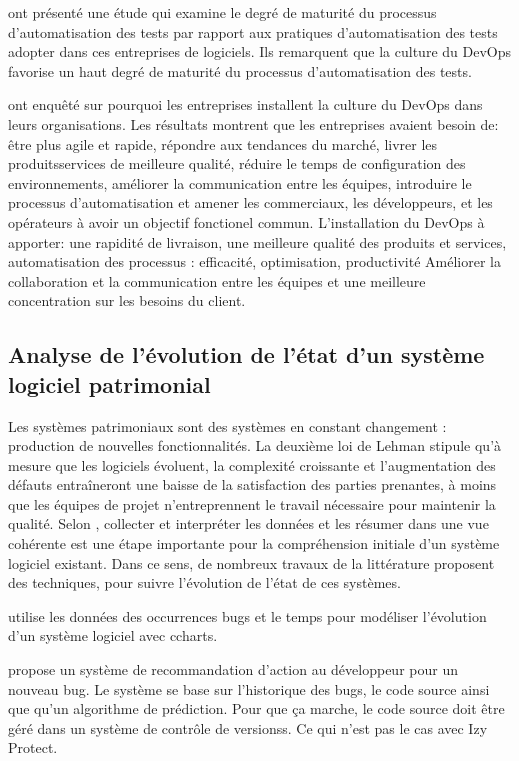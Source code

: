 \documentclass[a4paper]{article}
\begin{document}
\citet{Yuqi20a} ont présenté une étude qui examine le degré de maturité du processus d'automatisation des tests par rapport aux pratiques d'automatisation des tests adopter dans ces entreprises de logiciels.
Ils remarquent que la culture du DevOps favorise un haut degré de  maturité du processus d'automatisation des tests.

\citet{Jess20a} ont enquêté sur  pourquoi les entreprises installent la culture du DevOps  dans leurs organisations. 
Les résultats montrent que les entreprises avaient besoin de: être plus agile et rapide, répondre aux tendances du marché, livrer les produits\/services de meilleure qualité,
réduire le temps de configuration des environnements,  améliorer la communication entre les équipes, introduire le processus d'automatisation et amener les commerciaux, les développeurs, et les opérateurs à avoir un objectif fonctionel commun. 
L'installation du DevOps à apporter: une rapidité de livraison, une meilleure qualité des produits et services, automatisation des processus : efficacité, optimisation, productivité
Améliorer la collaboration et la communication entre les équipes et une meilleure concentration sur les besoins du client.



\subsection{Analyse de l'évolution de l'état d'un système logiciel patrimonial}
\label{sec:etatLogiciel}
Les systèmes patrimoniaux sont des systèmes en constant changement : production de nouvelles fonctionnalités.
La deuxième loi de Lehman \cite{Lehm96a} stipule qu'à mesure que les logiciels évoluent, la complexité croissante et l'augmentation des défauts entraîneront une baisse de la satisfaction des parties prenantes, à moins que les équipes de projet n'entreprennent le travail nécessaire pour maintenir la qualité.
Selon \citet{Deme02a}, collecter et interpréter les données et les résumer dans une vue cohérente est une étape importante pour la compréhension initiale d'un système logiciel existant.
Dans ce sens, de nombreux travaux de la littérature proposent des techniques, pour suivre l'évolution de l'état de ces systèmes.

\citet{Zhan10b} utilise les données des occurrences bugs et le temps pour modéliser l'évolution d'un système logiciel avec c\-charts.

\citet{lenar17} propose un système de recommandation d'action au développeur pour un nouveau bug.
Le système se base sur l'historique des bugs, le code source ainsi que qu'un algorithme de prédiction.
Pour que ça marche, le code source doit être géré dans un système de contrôle de versionss. 
Ce qui n'est pas le cas avec Izy Protect.
\end{document}
